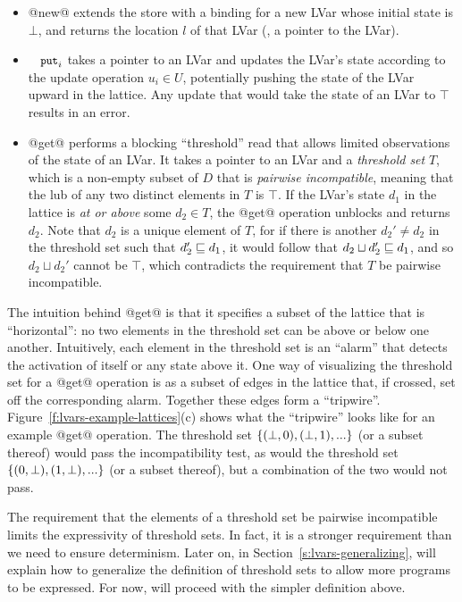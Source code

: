 \begin{itemize}
\item @new@ extends the store with a binding for a new LVar whose
  initial state is $\bot$, and returns the location $l$ of that LVar
  (\ie, a pointer to the LVar).
\item $\PUTi$ takes a pointer to an LVar and updates the LVar's state
  according to the update operation $u_i \in U$, potentially pushing the
  state of the LVar upward in the lattice.  Any update that would take
  the state of an LVar to $\top$ results in an error.
\item @get@ performs a blocking ``threshold'' read that allows limited
  observations of the state of an LVar.  It takes a pointer to an LVar
  and a \emph{threshold set} $T$, which is a non-empty subset of $D$
  that is \emph{pairwise incompatible}, meaning that the lub of any
  two distinct elements in $T$ is $\top$.  If the LVar's state $d_1$
  in the lattice is \emph{at or above} some $d_2 \in T$, the @get@
  operation unblocks and returns $d_2$.  Note that $d_2$ is a unique
  element of $T$, for if there is another $d_2' \neq d_2$ in the
  threshold set such that $d_2' \sqsubseteq d_1$, it would follow that
  $d_2 \sqcup d_2' \sqsubseteq d_1$, and so $d_2 \sqcup d_2'$ cannot be
  $\top$, which contradicts the requirement that $T$ be pairwise
  incompatible.
\end{itemize}
%
The intuition behind @get@ is that it specifies a subset of the
lattice that is ``horizontal'': no two elements in the threshold set
can be above or below one another.  Intuitively, each element in the
threshold set is an ``alarm'' that detects the activation of itself or
any state above it.  One way of visualizing the threshold set for a
@get@ operation is as a subset of edges in the lattice that, if
crossed, set off the corresponding alarm.  Together these edges form a
``tripwire''.  Figure~\ref{f:lvars-example-lattices}(c) shows what the
``tripwire'' looks like for an example @get@ operation.  The
threshold set $\lbrace (\bot, 0), (\bot, 1), ... \rbrace$ (or a subset
thereof) would pass the incompatibility test, as would the threshold
set $\lbrace (0, \bot), (1, \bot), ... \rbrace$ (or a subset thereof), but
a combination of the two would not pass.

The requirement that the elements of a threshold set be pairwise
incompatible limits the expressivity of threshold sets.  In fact, it
is a stronger requirement than we need to ensure determinism.  Later
on, in Section~\ref{s:lvars-generalizing},  will explain how to
generalize the definition of threshold sets to allow more programs
to be expressed.  For now,  will proceed with the simpler definition
above.
